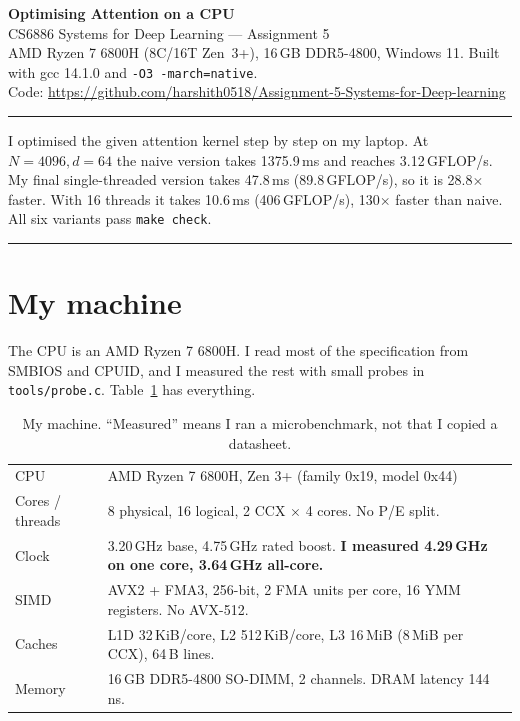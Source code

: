 \documentclass[10pt,a4paper]{article}
\newcommand{\code}[1]{\texttt{\small #1}}
\newcommand{\var}[1]{\texttt{#1}}
\begin{document}
\begin{center}
{\LARGE\bfseries Optimising Attention on a CPU}\\[2pt]
{\large CS6886 Systems for Deep Learning --- Assignment 5}\\[3pt]
{\small AMD Ryzen 7 6800H (8C/16T Zen~3+), 16\,GB DDR5-4800, Windows 11.
Built with gcc 14.1.0 and \code{-O3 -march=native}.}\\[2pt]
{\footnotesize Code: \url{https://github.com/harshith0518/Assignment-5-Systems-for-Deep-learning}}
\end{center}
\vspace{-8pt}

\noindent\rule{\linewidth}{0.4pt}
\small
I optimised the given attention kernel step by step on my laptop. At
$N{=}4096,d{=}64$ the naive version takes 1375.9\,ms and
reaches 3.12\,GFLOP/s. My final single-threaded version
takes 47.8\,ms (89.8\,GFLOP/s), so it is
28.8$\times$ faster. With 16 threads it takes
10.6\,ms (406\,GFLOP/s),
130$\times$ faster than naive. All six variants pass \var{make check}.\par
\noindent\rule{\linewidth}{0.4pt}
\normalsize

\section{My machine}

The CPU is an AMD Ryzen 7 6800H. I read most of the specification from SMBIOS
and CPUID, and I measured the rest with small probes in \var{tools/probe.c}.
Table~\ref{tab:machine} has everything.

\begin{table}[h]
\centering\footnotesize
\caption{My machine. ``Measured'' means I ran a microbenchmark, not that I copied a datasheet.}
\label{tab:machine}
\begin{tabular}{@{}ll@{}}
\toprule
CPU & AMD Ryzen 7 6800H, Zen 3+ (family 0x19, model 0x44) \\
Cores / threads & 8 physical, 16 logical, 2 CCX $\times$ 4 cores. No P/E split. \\
Clock & 3.20\,GHz base, 4.75\,GHz rated boost. \textbf{I measured 4.29\,GHz on one core, 3.64\,GHz all-core.} \\
SIMD & AVX2 + FMA3, 256-bit, 2 FMA units per core, 16 YMM registers. No AVX-512. \\
Caches & L1D 32\,KiB/core, L2 512\,KiB/core, L3 16\,MiB (8\,MiB per CCX), 64\,B lines. \\
Memory & 16\,GB DDR5-4800 SO-DIMM, 2 channels. DRAM latency 144\,ns. \\
\bottomrule
\end{tabular}
\end{table}
\end{document}
